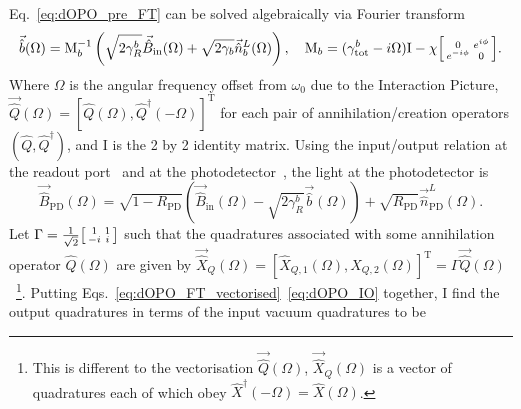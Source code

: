 Eq.~\ref{eq:dOPO_pre_FT} can be solved algebraically via Fourier transform~\cite{} %
\begin{equation}
\label{eq:dOPO_FT_vectorised}
\vec{\hat b}(\Omega)=\text{M}_b^{-1}\left(\sqrt{2\gamma^b_R}\vec{\hat{B}}_\mathrm{in}(\Omega) + \sqrt{2\gamma_b}\vec{\hat{n}}^L_b(\Omega)\right),\quad\text{M}_b=(\gamma^b_\mathrm{tot}-i \Omega)\text{I}-\chi \begin{bsmallmatrix}0 & e^{i\phi} \\e^{-i\phi} & 0\end{bsmallmatrix}.
\end{equation}
Where $\Omega$ is the angular frequency offset from $\omega_0$ due to the Interaction Picture, %
$\vec{\hat{Q}}(\Omega)=[\hat{Q}(\Omega),\hat{Q}^\dag(-\Omega)]^\text{T}$ for each pair of annihilation/creation operators $(\hat Q, \hat Q^\dag)$, and $\text{I}$  is the 2 by 2 identity matrix.
Using the input/output relation at the readout port~\cite{} and  at the photodetector~\cite{}, the light at the photodetector is
\begin{equation}
\label{eq:dOPO_IO}\vec{\hat{B}}_\mathrm{PD}(\Omega)=\sqrt{1-R_\text{PD}}\left(\vec{\hat{B}}_\mathrm{in}(\Omega)-\sqrt{2\gamma^b_R}\vec{\hat b}(\Omega)\right)+\sqrt{R_\text{PD}}\vec{\hat n}^L_\text{PD}(\Omega).
\end{equation} 
Let $\Gamma = \frac{1}{\sqrt2} \begin{bsmallmatrix}1 & 1 \\-i & i\end{bsmallmatrix}$ such that the quadratures associated with some annihilation operator $\hat{Q}(\Omega)$ are given by $\vec{\hat{X}}_Q(\Omega)=[\hat{X}_{Q,1}(\Omega),\hat{X}_{Q,2}(\Omega)]^\text{T}=\Gamma \vec{\hat{Q}}(\Omega)$~\footnote{This is different to the vectorisation $\vec{\hat{Q}}(\Omega)$, $\vec{\hat{X}}_Q(\Omega)$ is a vector of quadratures each of which obey $\hat{X}^\dag(-\Omega)=\hat{X}(\Omega)$.}. Putting Eqs.~\ref{eq:dOPO_FT_vectorised}~\ref{eq:dOPO_IO} together, I find the output quadratures in terms of the input vacuum quadratures to be
